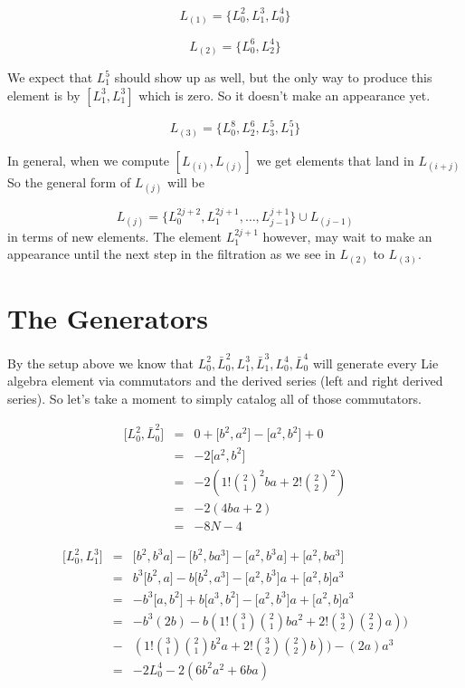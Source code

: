 \documentclass{article}
\newcommand{\lrbrack}[2]{\lbrack #1 , #2 \rbrack}
\begin{document}
\[
L_{(1)} = \{L_0^2, L_1^3, L_0^4\}
\]

\[
L_{(2)} = \{L_0^6, L_2^4\}
\]

We expect that $L_1^5$ should show up as well, but the only way to produce this element is by $[L_1^3,L_1^3]$ which is zero.  So it doesn't make an appearance yet.

\[
L_{(3)} = \{L_0^8,L_2^6,L_3^5,L_1^5 \}
\]

In general, when we compute $[L_{(i)},L_{(j)}]$ we get elements that land in $L_{(i+j)}$  So the general form of $L_{(j)}$ will be

\[
L_{(j)} = \{L_0^{2j+2},L_1^{2j+1},\dots, L_{j-1}^{j+1}\} \cup L_{(j-1)}
\] 
in terms of new elements.  The element $L_1^{2j+1}$ however, may wait to make an appearance until the next step in the filtration as we see in $L_{(2)}$ to $L_{(3)}$.


\section*{The Generators}

By the setup above we know that $L_0^2, \bar{L}_0^2, L_1^3, \bar{L}_1^3, L_0^4,\bar{L}_0^4$ will generate every Lie algebra element via commutators and the derived series (left and right derived series).  So let's take a moment to simply catalog all of those commutators.

\begin{eqnarray*}
\lrbrack{L_0^2}{\bar{L}_0^2} &=& 0 + \lrbrack{b^2}{a^2} - \lrbrack{a^2}{b^2} + 0\\
& = & - 2 \lrbrack{a^2}{b^2}\\
& = & -2(1!{2 \choose 1}^2 ba + 2!{2 \choose 2}^2)\\
& = & -2(4ba + 2)\\
& = & -8 N - 4
\end{eqnarray*}


\begin{eqnarray*}
	\lrbrack{L_0^2}{L_1^3} &=&  \lrbrack{b^2}{b^3 a}- \lrbrack{b^2}{b a^3} - \lrbrack{a^2}{b^3 a} + \lrbrack{a^2}{b a^3}\\
	& = &  b^3 \lrbrack{b^2}{a}- b \lrbrack{b^2}{a^3} - \lrbrack{a^2}{b^3 }a + \lrbrack{a^2}{b }a^3\\
	& = &  -b^3 \lrbrack{a}{b^2} + b \lrbrack{a^3}{b^2} - \lrbrack{a^2}{b^3 }a + \lrbrack{a^2}{b }a^3\\
	& = & -b^3(2 b) - b(1!{3 \choose 1}{2\choose 1}b a^2 + 2!{3 \choose 2}{2\choose 2}a) )\\
	& - &  (1!{3 \choose 1}{2\choose 1}b^2 a + 2!{3 \choose 2}{2\choose 2}b)) - (2a)a^3\\
	& = & -2 L_0^4 - 2(6 b^2 a^2 + 6 ba) 
\end{eqnarray*}
\end{document}
